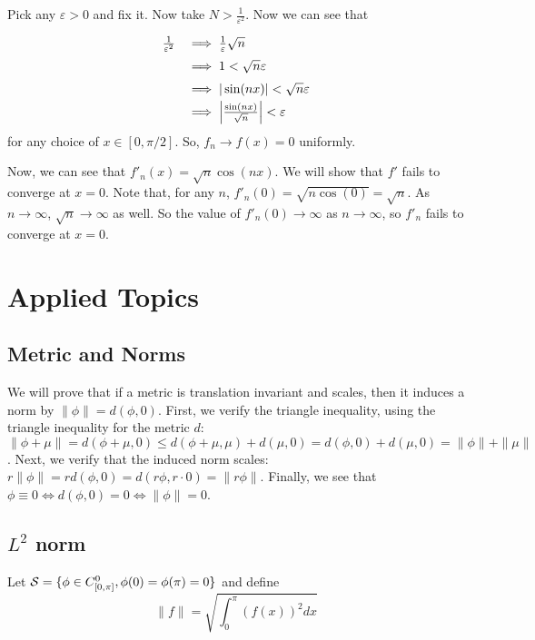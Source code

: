 \documentclass[11pt]{article}
\renewcommand{\S}{{\cal S}}
\begin{document}
Pick any $\varepsilon>0$ and fix it. Now take $N>\frac{1}{\varepsilon^2}$.
Now we can see that
\[
\def\arraystretch{1.5}
\begin{array}{rl}
\frac{1}{\varepsilon^2} &\implies \frac{1}{\varepsilon}\sqrt{n} \\
&\implies 1<\sqrt{n}\varepsilon \\
&\implies |\sin(nx)|<\sqrt{n}\varepsilon \\
&\implies \left| \frac{\sin(nx)}{\sqrt{n}}\right| < \varepsilon
\end{array}
\]
for any choice of $x\in[0,\pi/2]$. So, $f_n\to f(x)=0$ uniformly.

Now, we can see that $f'_n(x) = \sqrt{n}\cos(nx)$. We will show that
$f'$ fails to converge at $x=0$. Note that, for any $n$,
$f'_n(0)=\sqrt{n\cos(0)}=\sqrt{n}$. As $n\to\infty$, $\sqrt{n}\to\infty$ as well.
So the value of $f'_n(0)\to\infty$ as $n\to\infty$, so $f'_n$ fails to converge
at $x=0$. 

\section*{Applied Topics}

\subsection*{Metric and Norms}

We will prove that if a metric is translation invariant and scales, then it induces a norm
by $\|\phi\|=d(\phi,0)$.
First, we verify the triangle inequality, using the triangle inequality for the metric $d$:
$\|\phi+\mu\|=d(\phi+\mu,0)\leq d(\phi+\mu,\mu)+d(\mu,0)=d(\phi,0)+d(\mu,0)=\|\phi\|+\|\mu\|$.
Next, we verify that the induced norm scales:
$r\|\phi\|=rd(\phi,0)=d(r\phi,r\cdot0)=\|r\phi\|$.
Finally, we see that
$\phi\equiv0\iff d(\phi,0)=0\iff\|\phi\|=0$.

\subsection*{$L^2$ norm}

Let $\S = \{\phi\in C_{[0,\pi]}^0,\phi(0)=\phi(\pi)=0\}$ and define
\[
\|f\|=\sqrt{\int_0^\pi(f(x))^2dx}
\]
\end{document}
